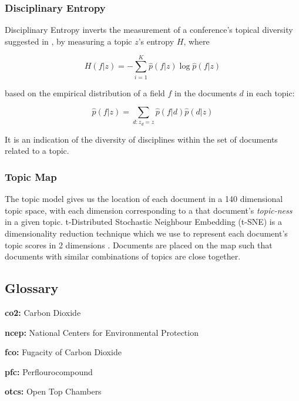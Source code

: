 \documentclass{article}
\begin{document}
\begin{linenumbers}
		
		\subsubsection*{Disciplinary Entropy}
		
		Disciplinary Entropy inverts the measurement of a conference's topical diversity suggested in \cite{Hall2008}, by measuring a topic \(z\)'s entropy \(H\), where 
		
		\begin{equation}
		H(f|z) = -\sum_{i=1}^K \hat{p}(f|z) \log \hat{p}(f|z) 
		\end{equation}
		
		based on the empirical distribution of a field \(f\) in the documents \(d\) in each topic:
		
		\begin{equation}
		\hat{p}(f|z) = \sum_{d:z_d=z} \hat{p} (f|d) \hat{p} (d|z)
		\end{equation}
		
		It is an indication of the diversity of disciplines within the set of documents related to a topic. 
		
		\subsubsection*{Topic Map}
		The topic model gives us the location of each document in a 140 dimensional topic space, with each dimension corresponding to a that document's \textit{topic-ness} in a given topic. t-Distributed Stochastic Neighbour Embedding (t-SNE) is a dimensionality reduction technique which we use to represent each document's topic scores in 2 dimensions \cite{vandermaaten2008}. Documents are placed on the map such that documents with similar combinations of topics are close together.
		

		
		
		\subsection*{Glossary}
		
		\noindent\textbf{co2:} Carbon Dioxide
		
		\noindent\textbf{ncep:} National Centers for Environmental Protection
		
		\noindent\textbf{fco:} Fugacity of Carbon Dioxide
		
		\noindent\textbf{pfc:} Perflourocompound
		
		\noindent\textbf{otcs:} Open Top Chambers
		

\end{linenumbers}
\end{document}
